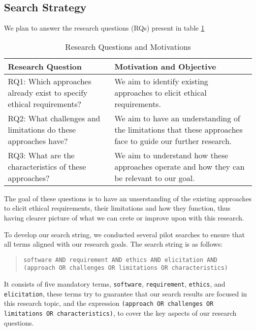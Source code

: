 

\subsection{Search Strategy}
\label{sec: SMS_Search_Strategy}

We plan to answer the research questions (RQs) present in table \ref{tab:research_questions}
\begin{table}[h]
  \centering
  \renewcommand{\arraystretch}{1.3}
  \begin{tabular}{| m{6cm} | m{8cm} |}
      \hline
      \textbf{Research Question} & \textbf{Motivation and Objective} \\
      \hline
      RQ1: Which approaches already exist to specify ethical requirements? & We aim to identify existing approaches to elicit ethical requirements. \\
      \hline
      RQ2: What challenges and limitations do these approaches have? & We aim to have an understanding of the limitations that these approaches face to guide our further research. \\
      \hline
      RQ3: What are the characteristics of these approaches? & We aim to understand how these approaches operate and how they can be relevant to our goal. \\
      \hline
  \end{tabular}
  \caption{Research Questions and Motivations}
  \label{tab:research_questions}
\end{table}

The goal of these questions is to have an unserstanding of the existing approaches to elicit ethical requirements, their limitations and how they function, 
thus having clearer picture of what we can crete or improve upon with this research.

To develop our search string, we conducted several pilot searches to ensure that all terms aligned with our research goals.
The search string is as follows:
\begin{quote}
  \texttt{software AND requirement AND ethics AND elicitation AND (approach OR challenges OR limitations OR characteristics)}
\end{quote} 
It consists of five mandatory terms, \texttt{software}, \texttt{requirement}, \texttt{ethics}, and \texttt{elicitation}, these terms try to guarantee that
our search results are focused in this research topic, and the expression \texttt{(approach OR challenges OR limitations OR characteristics)}, to cover 
the key aspects of our research questions.

